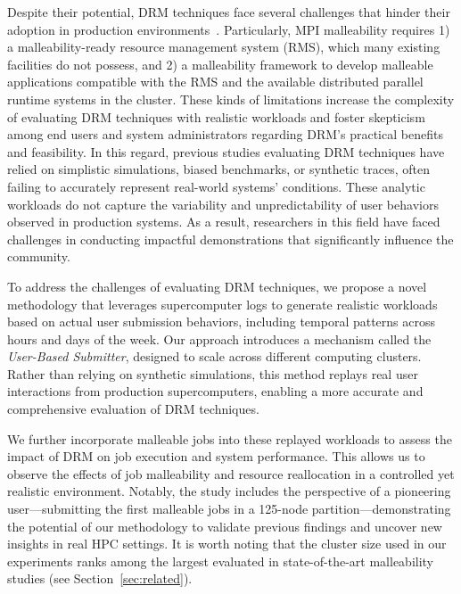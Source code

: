 \documentclass[a4paper,fleqn]{cas-dc}
\begin{document}
Despite their potential, DRM techniques face several challenges that hinder their adoption in production environments~\cite{iserte_dmr_2018}.
Particularly, MPI malleability requires 1) a malleability-ready resource management system (RMS), which many existing facilities do not possess, and 2) a malleability framework to develop malleable applications compatible with the RMS and the available distributed parallel runtime systems in the cluster.
These kinds of limitations increase the complexity of evaluating DRM techniques with realistic workloads and foster skepticism among end users and system administrators regarding DRM's practical benefits and feasibility.
In this regard, previous studies evaluating DRM techniques have relied on simplistic simulations, biased benchmarks, or synthetic traces, often failing to accurately represent real-world systems' conditions. These analytic workloads do not capture the variability and unpredictability of user behaviors observed in production systems. As a result, researchers in this field have faced challenges in conducting impactful demonstrations that significantly influence the community.

To address the challenges of evaluating DRM techniques, we propose a novel methodology that leverages supercomputer logs to generate realistic workloads based on actual user submission behaviors, including temporal patterns across hours and days of the week. Our approach introduces a mechanism called the \textit{User-Based Submitter}, designed to scale across different computing clusters. Rather than relying on synthetic simulations, this method replays real user interactions from production supercomputers, enabling a more accurate and comprehensive evaluation of DRM techniques.

We further incorporate malleable jobs into these replayed workloads to assess the impact of DRM on job execution and system performance. This allows us to observe the effects of job malleability and resource reallocation in a controlled yet realistic environment. Notably, the study includes the perspective of a pioneering user—submitting the first malleable jobs in a 125-node partition—demonstrating the potential of our methodology to validate previous findings and uncover new insights in real HPC settings. It is worth noting that the cluster size used in our experiments ranks among the largest evaluated in state-of-the-art malleability studies (see Section~\ref{sec:related}).
\end{document}
